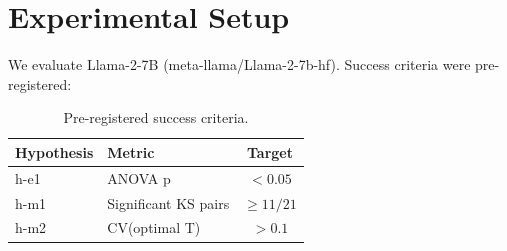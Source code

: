 \section{Experimental Setup}

We evaluate Llama-2-7B (meta-llama/Llama-2-7b-hf). Success criteria were pre-registered:

\begin{table}[h]
\centering
\begin{tabular}{@{}llc@{}}
\toprule
\textbf{Hypothesis} & \textbf{Metric} & \textbf{Target} \\
\midrule
h-e1 & ANOVA p & $< 0.05$ \\
h-m1 & Significant KS pairs & $\geq 11/21$ \\
h-m2 & CV(optimal T) & $> 0.1$ \\
\bottomrule
\end{tabular}
\caption{Pre-registered success criteria.}
\label{tab:criteria}
\end{table}
